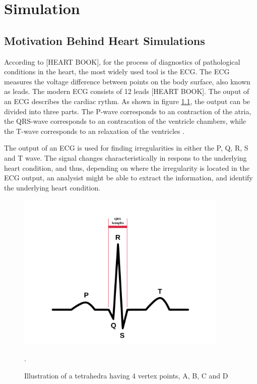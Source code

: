 \chapter{Simulation}
\section{Motivation Behind Heart Simulations}
According to [HEART BOOK], for the process of diagnostics of pathological conditions in the heart, the most widely used tool is the ECG. The ECG measures the voltage difference between points on the body surface, also known as leads. The modern ECG consists of 12 leads [HEART BOOK]. The ouput of an ECG describes the cardiac rythm. As shown in figure \ref{b_ecg_pqrst.png}, the output can be divided into three parts. The P-wave corresponds to an contraction of the atria, the QRS-wave corresponds to an contracation of the ventricle chambers, while the T-wave corresponds to an relaxation of the ventricles \cite{article24}. 

The output of an ECG is used for finding irregularities in either the P, Q, R, S and T wave. The signal changes characteristically in respons to the underlying heart condition, and thus, depending on where the irregularity is located in the ECG output, an analysist might be able to extract the information, and identify the underlying heart condition.
\begin{figure}[h]
 \centering 
     \includegraphics[width=0.9\textwidth]{bilder/b_ecg_pqrst}
     \caption{Illustration of a tetrahedra having 4 vertex points, A, B, C and D}.
     \label{b_ecg_pqrst.png}
\end{figure}

